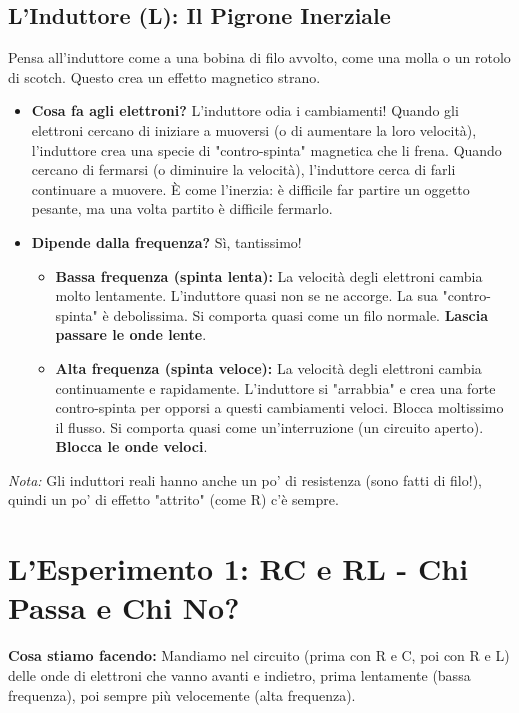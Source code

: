 \documentclass[a4paper, 11pt]{article}
\begin{document}
\subsection*{L'Induttore (L): Il Pigrone Inerziale}
Pensa all'induttore come a una bobina di filo avvolto, come una molla o un rotolo di scotch. Questo crea un effetto magnetico strano.
\begin{itemize}
    \item \textbf{Cosa fa agli elettroni?} L'induttore odia i cambiamenti! Quando gli elettroni cercano di iniziare a muoversi (o di aumentare la loro velocità), l'induttore crea una specie di "contro-spinta" magnetica che li frena. Quando cercano di fermarsi (o diminuire la velocità), l'induttore cerca di farli continuare a muovere. È come l'inerzia: è difficile far partire un oggetto pesante, ma una volta partito è difficile fermarlo.
    \item \textbf{Dipende dalla frequenza?} Sì, tantissimo!
        \begin{itemize}
            \item \textbf{Bassa frequenza (spinta lenta):} La velocità degli elettroni cambia molto lentamente. L'induttore quasi non se ne accorge. La sua "contro-spinta" è debolissima. Si comporta quasi come un filo normale. \textbf{Lascia passare le onde lente}.
            \item \textbf{Alta frequenza (spinta veloce):} La velocità degli elettroni cambia continuamente e rapidamente. L'induttore si "arrabbia" e crea una forte contro-spinta per opporsi a questi cambiamenti veloci. Blocca moltissimo il flusso. Si comporta quasi come un'interruzione (un circuito aperto). \textbf{Blocca le onde veloci}.
        \end{itemize}
\end{itemize}
\textit{Nota:} Gli induttori reali hanno anche un po' di resistenza (sono fatti di filo!), quindi un po' di effetto "attrito" (come R) c'è sempre.

\section*{L'Esperimento 1: RC e RL - Chi Passa e Chi No?}

\textbf{Cosa stiamo facendo:} Mandiamo nel circuito (prima con R e C, poi con R e L) delle onde di elettroni che vanno avanti e indietro, prima lentamente (bassa frequenza), poi sempre più velocemente (alta frequenza).
\end{document}
